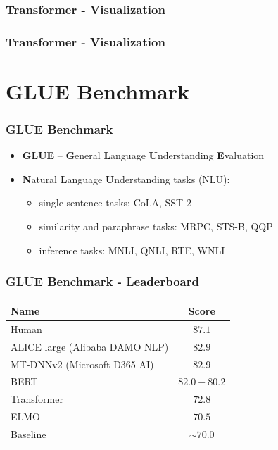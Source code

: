 \documentclass{beamer}
\begin{document}
\begin{frame}
    \frametitle{Transformer - Visualization}
\end{frame}

\begin{frame}
    \frametitle{Transformer - Visualization}
\end{frame}



\section{GLUE Benchmark}

\begin{frame}
    \frametitle{GLUE Benchmark \cite{glue}}
    \begin{itemize}
        \item \textbf{GLUE} -- \textbf{G}eneral \textbf{L}anguage \textbf{U}nderstanding \textbf{E}valuation
        \item \textbf{N}atural \textbf{L}anguage \textbf{U}nderstanding tasks (NLU):
        \begin{itemize}
			\item single-sentence tasks: CoLA, SST-2
			\item similarity and paraphrase tasks: MRPC, STS-B, QQP
			\item inference tasks: MNLI, QNLI, RTE, WNLI
        \end{itemize}
    \end{itemize}
\end{frame}

\begin{frame}
    \frametitle{GLUE Benchmark - Leaderboard}
    \begin{center}
    	\begin{tabular}{l | c}
    		\textbf{Name} & \textbf{Score} \\
    		\hline
    		Human & $ 87.1 $ \\
    		ALICE large (Alibaba DAMO NLP) & $ 82.9 $ \\
    		MT-DNNv2 (Microsoft D365 AI) & $ 82.9 $ \\
    		BERT & $ 82.0-80.2 $ \\
    		Transformer & $ 72.8 $ \\
    		ELMO & $ 70.5 $ \\
    		Baseline & $ \sim 70.0 $
    	\end{tabular}
    \end{center}
\end{frame}
\end{document}
